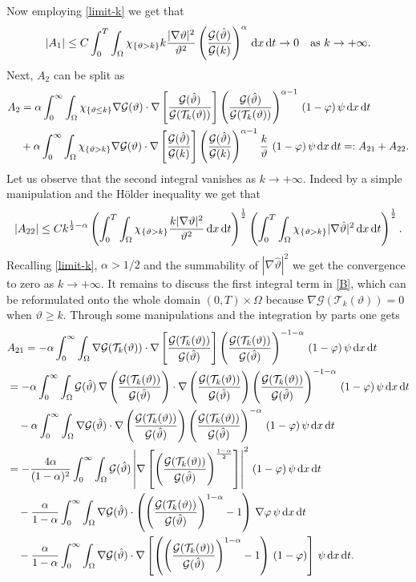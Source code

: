 \documentclass[11pt, a4paper, reqno]{amsart}
\numberwithin{equation}{section}
\newcommand{\thetah}{\hat\thet}
\newcommand{\thet}{\vartheta}
\newcommand{\dt}{\,{\rm d} t }
\newcommand{\dx}{\,{\rm d} {x}}
\newcommand{\dxdt}{\dx  \dt}
\newcommand{\G}{\mathcal{G}}
\newcommand{\al}{\alpha}
\newcommand{\intnO}[1]{\int_0^{\infty}\intO{ #1 }\dt}
\newcommand{\intO}[1]{\int_{\Omega} #1 \dx}
\newcommand{\intTO}[1]{\int_0^T \int_{\Omega} #1  \dxdt}
\begin{document}
Now employing \eqref{limit-k} we get that
$$
|A_1|\leq C\intTO{\chi_{\{\thet>k\}}k\frac{|\nabla\thet|^2}{\thet^2}\left(\frac{\G(\thetah)}{\G(k)}\right)^{\al}}\to 0\quad\mbox{as $k\to+\infty$.} 
$$
Next, $A_2$ can be split as
\begin{equation}\label{B}
\begin{split}
A_2&= \al \intnO{\chi_{\{\thet\leq k\}} \nabla \G(\thet) \cdot \nabla\left[ \frac{\G(\thetah)}{\G(\mathcal{T}_k(\thet))}\right]\left( \frac{\G(\thetah)}{\G(\mathcal{T}_k(\thet))}\right)^{\al-1}\,(1-\varphi)\,\psi} \\
 &+\al\intnO{\chi_{\{\thet>k\}}{\nabla \G(\thet) \cdot \nabla\left[ \frac{\G(\thetah)}{\G(k)}\right]\left( \frac{\G(\thetah)}{\G(k)}\right)^{\al-1}\frac{k}{\thet}\,\,(1-\varphi)\,\psi }}=:A_{21}+A_{22}.
\end{split}
\end{equation}
Let us observe that the second integral vanishes as $k\to +\infty$. Indeed by a simple manipulation and the H\"{o}lder inequality we get that
\begin{equation*}
|A_{22}|\leq Ck^{\frac12-\al}\left(\intTO{\chi_{\{\thet>k\}} \frac{k|\nabla\thet|^2}{\thet^{2}}}\right)^{\frac{1}{2}} \left( \intTO{\chi_{\{\thet>k\}}|\nabla\thetah|^2}\right)^{\frac{1}{2}}.
\end{equation*}
Recalling \eqref{limit-k}, $\alpha>1/2$ and the summability of $|\nabla\thetah|^2$ we get the convergence to zero as $k\to +\infty$.
It remains to discuss the first integral term in \eqref{B}, which can be reformulated onto the whole domain $(0, T)\times\Omega$ because $\nabla \G(\mathcal{T}_k(\thet))=0$ when $\thet\geq k$. Through some manipulations and the integration by parts one gets
\begin{equation}\label{ell}
\begin{split}
&A_{21}=-\al \intnO{ \nabla \G(\mathcal{T}_k(\thet)) \cdot \nabla\left[ \frac{\G(\mathcal{T}_k(\thet))}{\G(\thetah)}\right]\left( \frac{\G(\mathcal{T}_k(\thet))}{\G(\thetah)}\right)^{-1-\al}\,(1-\varphi)\,\psi}\\
&=-\al\intnO{ \G(\thetah) \,\nabla\left(\frac{\G(\mathcal{T}_k(\thet))}{\G(\thetah)}\right) \cdot \nabla\left( \frac{\G(\mathcal{T}_k(\thet))}{\G(\thetah)}\right)\left( \frac{\G(\mathcal{T}_k(\thet))}{\G(\thetah)}\right)^{-1-\al}\,(1-\varphi)\,\psi}\\
&\quad - \al \intnO{  \nabla \G(\thetah) \cdot \nabla\left( \frac{\G(\mathcal{T}_k(\thet))}{\G(\thetah)}\right)\left( \frac{\G(\mathcal{T}_k(\thet))}{\G(\thetah)}\right)^{-\al}\,(1-\varphi)\,\psi}\\
&=-\frac{4\al}{(1-\al)^2}\intnO{ \G(\thetah) \left|\nabla\left[\left(\frac{\G(\mathcal{T}_k(\thet))}{\G(\thetah)}\right)^{\frac{1-\al}{2}}\right]\right|^2 \,(1-\varphi)\,\psi}\\
&\quad - \frac{\al}{1-\al} \intnO{  \nabla \G(\thetah) \cdot \left(\left( \frac{\G(\mathcal{T}_k(\thet))}{\G(\thetah)}\right)^{1-\alpha}-1\right)\,\nabla\varphi\,\psi}\\
&\quad - \frac{\al}{1-\al} \intnO{  \nabla \G(\thetah) \cdot \nabla\left[\left(\left( \frac{\G(\mathcal{T}_k(\thet))}{\G(\thetah)}\right)^{1-\alpha}-1\right)\,(1-\varphi)\right]\,\psi}.
\end{split}
\end{equation}
\end{document}
